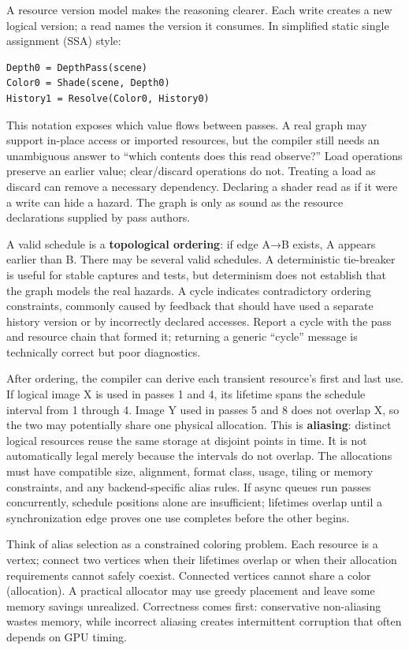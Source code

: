 A resource version model makes the reasoning clearer. Each write creates a new logical version; a read names the version it consumes. In simplified static single assignment (SSA) style:

\begin{verbatim}
Depth0 = DepthPass(scene)
Color0 = Shade(scene, Depth0)
History1 = Resolve(Color0, History0)
\end{verbatim}

This notation exposes which value flows between passes. A real graph may support in-place access or imported resources, but the compiler still needs an unambiguous answer to ``which contents does this read observe?'' Load operations preserve an earlier value; clear/discard operations do not. Treating a load as discard can remove a necessary dependency. Declaring a shader read as if it were a write can hide a hazard. The graph is only as sound as the resource declarations supplied by pass authors.

A valid schedule is a \textbf{topological ordering}: if edge A→B exists, A appears earlier than B. There may be several valid schedules. A deterministic tie-breaker is useful for stable captures and tests, but determinism does not establish that the graph models the real hazards. A cycle indicates contradictory ordering constraints, commonly caused by feedback that should have used a separate history version or by incorrectly declared accesses. Report a cycle with the pass and resource chain that formed it; returning a generic ``cycle'' message is technically correct but poor diagnostics.

After ordering, the compiler can derive each transient resource's first and last use. If logical image X is used in passes 1 and 4, its lifetime spans the schedule interval from 1 through 4. Image Y used in passes 5 and 8 does not overlap X, so the two may potentially share one physical allocation. This is \textbf{aliasing}: distinct logical resources reuse the same storage at disjoint points in time. It is not automatically legal merely because the intervals do not overlap. The allocations must have compatible size, alignment, format class, usage, tiling or memory constraints, and any backend-specific alias rules. If async queues run passes concurrently, schedule positions alone are insufficient; lifetimes overlap until a synchronization edge proves one use completes before the other begins.

Think of alias selection as a constrained coloring problem. Each resource is a vertex; connect two vertices when their lifetimes overlap or when their allocation requirements cannot safely coexist. Connected vertices cannot share a color (allocation). A practical allocator may use greedy placement and leave some memory savings unrealized. Correctness comes first: conservative non-aliasing wastes memory, while incorrect aliasing creates intermittent corruption that often depends on GPU timing.

